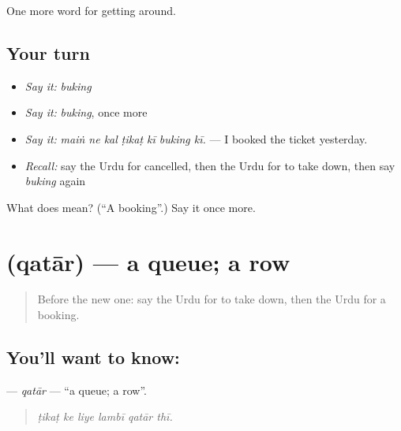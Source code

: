 \begin{grammarlens}[title={What you've built}]
One more word for getting around.
\end{grammarlens}

\subsection*{Your turn}
\begin{itemize}
\raggedright
  \item \emph{Say it:} \emph{buking}
  \item \emph{Say it:} \emph{buking}, once more
  \item \emph{Say it:} \emph{maiṅ ne kal ṭikaṭ kī buking kī.} — I booked the ticket yesterday.
  \item \emph{Recall:} say the Urdu for cancelled, then the Urdu for to take down, then say \emph{buking} again
\end{itemize}

\begin{tcolorbox}[breakable,colback=teal!4,colframe=teal!35!black,title={Before you move on}]
What does  mean? (\textquotedblleft{}A booking\textquotedblright{}.) Say it once more.
\end{tcolorbox}
\section[\texorpdfstring{\ur{قطار} (qatār)}{قطار (qatār)}]{ (qatār) — a queue; a row}

\label{lesson:UR-C391-qatar}



\begin{quote}
Before the new one: say the Urdu for to take down, then the Urdu for a booking.
\end{quote}

\subsection*{You'll want to know: }
\textbf{} — \emph{qatār} — \textquotedblleft{}a queue; a row\textquotedblright{}.

\begin{quote}
     
\end{quote}

\begin{quote}
\emph{ṭikaṭ ke liye lambī qatār thī.}
\end{quote}

